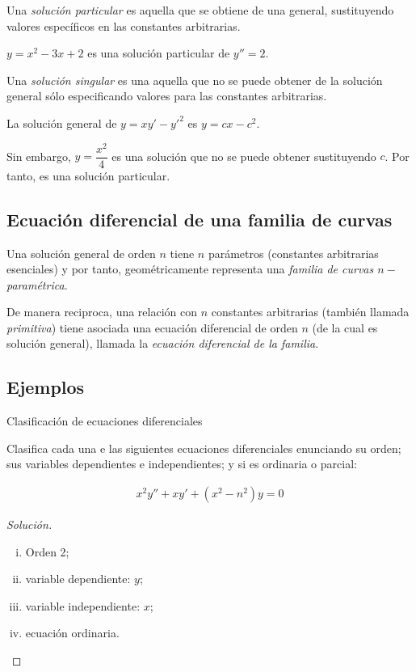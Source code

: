 {}
	Una \emph{solución particular} es aquella que se obtiene de una general, sustituyendo valores específicos en las constantes arbitrarias.

{}
	\begin{problema}
		\label{exmp 02:08}
		$ y = x^2-3x+2 $ es una solución particular de $ y''=2 $. 
	\end{problema}


	Una \emph{solución singular} es una aquella que no se puede obtener de la solución general sólo especificando valores para las constantes arbitrarias. 

{}
	\begin{problema}
		La solución general de $ y = xy'-y'^{2} $ es $ y = cx-c^{2} $. 
		
		 Sin embargo, $ y=\dfrac{x^{2}}{4} $ es una solución que no se puede obtener sustituyendo $ c $.  Por tanto, es una solución particular.
	\end{problema}

\subsection{Ecuación diferencial de una familia de curvas}
{}
Una solución general de orden $ n $ tiene $ n $ parámetros (constantes arbitrarias esenciales) y por tanto, geométricamente representa una \emph{familia de curvas $n-$paramétrica. }

{}
	De manera reciproca, una relación con $ n $ constantes arbitrarias (también llamada \emph{primitiva}) tiene asociada una ecuación diferencial de orden $n$ (de la cual es solución general), llamada la \emph{ecuación diferencial de la familia}.

\subsection{Ejemplos}
{Clasificación de ecuaciones diferenciales}
\begin{problema}
		Clasifica cada una e las siguientes ecuaciones diferenciales enunciando su orden; sus variables dependientes e independientes; y si es ordinaria o parcial:	
\end{problema}

{}
		\begin{align*}
		x^2y''+xy'+\left(x^2-n^2\right)y = 0
		\end{align*} 
\begin{proof}[Solución]
	\begin{enumerate}[(i)]
		\item Orden 2;
		\item variable dependiente: $ y $;
		\item variable independiente: $ x $; 
		\item ecuación ordinaria.
	\end{enumerate}
\end{proof}

